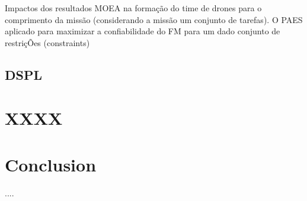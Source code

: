 \documentclass[12pt,oneside, a4paper]{article}
\renewcommand{\baselinestretch}{1.0}
\begin{document}
Impactos dos resultados MOEA na formação do time de drones para o comprimento da missão (considerando a missão um conjunto de tarefas). O PAES aplicado para maximizar a confiabilidade do FM para um dado conjunto de restriçÕes (constraints)

\subsection{DSPL}

\section{XXXX}

\section{Conclusion}
....

\renewcommand{\bibfont}{\small}
\renewcommand{\baselinestretch}{1.0} 


\end{document}
